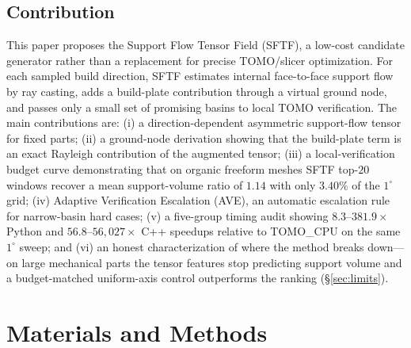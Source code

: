\documentclass[12pt]{article}
\begin{document}
\subsection{Contribution}
This paper proposes the Support Flow Tensor Field (SFTF), a low-cost candidate
generator rather than a replacement for precise TOMO/slicer optimization. For each
sampled build direction, SFTF estimates internal face-to-face support flow by ray
casting, adds a build-plate contribution through a virtual ground node, and passes
only a small set of promising basins to local TOMO verification. The main
contributions are: (i) a direction-dependent asymmetric support-flow tensor for
fixed parts; (ii) a ground-node derivation showing that the build-plate term is an
exact Rayleigh contribution of the augmented tensor; (iii) a local-verification
budget curve demonstrating that on organic freeform meshes SFTF top-$20$ windows
recover a mean support-volume ratio of $1.14$ with only $3.40\%$ of the $1^\circ$
grid; (iv) Adaptive Verification Escalation (AVE), an automatic escalation rule for
narrow-basin hard cases; (v) a five-group timing audit showing $8.3$--$381.9\times$
Python and $56.8$--$56{,}027\times$ C++ speedups relative to TOMO\_CPU on the same
$1^\circ$ sweep; and (vi) an honest characterization of where the method breaks
down---on large mechanical parts the tensor features stop predicting support volume
and a budget-matched uniform-axis control outperforms the ranking (\S\ref{sec:limits}).

\section{Materials and Methods}
\end{document}
